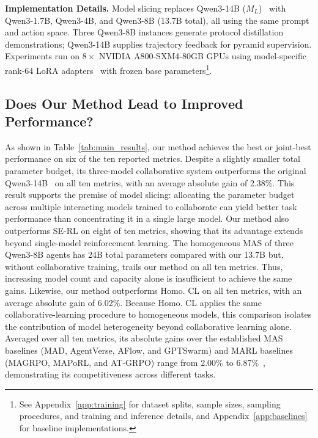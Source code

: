 \documentclass{article} %
\begin{document}
\noindent\textbf{Implementation Details.}\quad
Model slicing replaces Qwen3-14B ($M_L$)~\citep{yang2025qwen3} with Qwen3-1.7B, Qwen3-4B, and Qwen3-8B (13.7B total), all using the same prompt and action space. Three Qwen3-8B instances generate protocol distillation demonstrations; Qwen3-14B supplies trajectory feedback for pyramid supervision. Experiments run on $8\times$ NVIDIA A800-SXM4-80GB GPUs using model-specific rank-64 LoRA adapters~\citep{hu2022lora} with frozen base parameters\footnote{See Appendix~\ref{app:training} for dataset splits, sample sizes, sampling procedures, and training and inference details, and Appendix~\ref{app:baselines} for baseline implementations.}.

\subsection{Does Our Method Lead to Improved Performance?}
\label{sec:main_results}


\vspace{-1.5em}


\FloatBarrier

As shown in Table~\ref{tab:main_results}, our method achieves the best or joint-best performance on six of the ten reported metrics. Despite a slightly smaller total parameter budget, its three-model collaborative system outperforms the original Qwen3-14B~\citep{yang2025qwen3} on all ten metrics, with an average absolute gain of 2.38\%. This result supports the premise of model slicing: allocating the parameter budget across multiple interacting models trained to collaborate can yield better task performance than concentrating it in a single large model. Our method also outperforms SE-RL on eight of ten metrics, showing that its advantage extends beyond single-model reinforcement learning. The homogeneous MAS of three Qwen3-8B agents has 24B total parameters compared with our 13.7B but, without collaborative training, trails our method on all ten metrics. Thus, increasing model count and capacity alone is insufficient to achieve the same gains. Likewise, our method outperforms Homo. CL on all ten metrics, with an average absolute gain of 6.02\%. Because Homo. CL applies the same collaborative-learning procedure to homogeneous models, this comparison isolates the contribution of model heterogeneity beyond collaborative learning alone. Averaged over all ten metrics, its absolute gains over the established MAS baselines (MAD, AgentVerse, AFlow, and GPTSwarm) and MARL baselines (MAGRPO, MAPoRL, and AT-GRPO) range from 2.00\% to 6.87\%~\citep{du2024debate,chen2024agentverse,zhang2025aflow,zhuge2024gptswarm,liu2026collaboration,park2025maporl,zhao2026strongermas}, demonstrating its competitiveness across different tasks.
\end{document}
